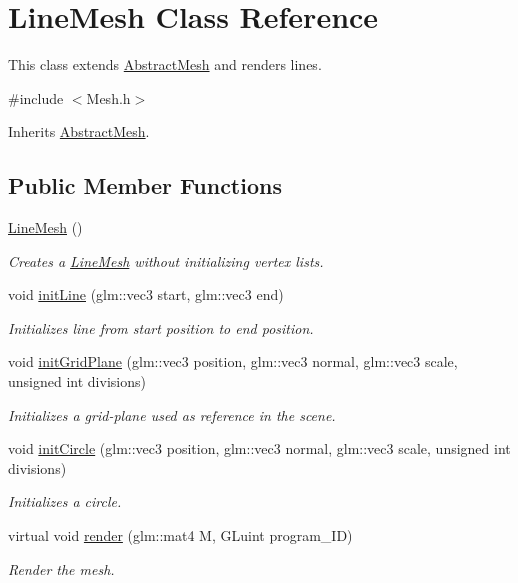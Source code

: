 \hypertarget{class_line_mesh}{\section{Line\-Mesh Class Reference}
\label{class_line_mesh}
}


This class extends \hyperlink{class_abstract_mesh}{Abstract\-Mesh} and renders lines.  




{\ttfamily \#include $<$Mesh.\-h$>$}



Inherits \hyperlink{class_abstract_mesh}{Abstract\-Mesh}.

\subsection*{Public Member Functions}
\begin{DoxyCompactItemize}
\item 
\hyperlink{class_line_mesh_a2a4c9b45b462d7733ca95020342c828a}{Line\-Mesh} ()
\begin{DoxyCompactList}\small\item\em Creates a \hyperlink{class_line_mesh}{Line\-Mesh} without initializing vertex lists. \end{DoxyCompactList}\item 
void \hyperlink{class_line_mesh_ae39037e3e68db0d05102225b3958e368}{init\-Line} (glm\-::vec3 start, glm\-::vec3 end)
\begin{DoxyCompactList}\small\item\em Initializes line from start position to end position. \end{DoxyCompactList}\item 
void \hyperlink{class_line_mesh_ad635ffbca27ac5d40cdaa24e4dd5f2d8}{init\-Grid\-Plane} (glm\-::vec3 position, glm\-::vec3 normal, glm\-::vec3 scale, unsigned int divisions)
\begin{DoxyCompactList}\small\item\em Initializes a grid-\/plane used as reference in the scene. \end{DoxyCompactList}\item 
void \hyperlink{class_line_mesh_a3367b57d600876a95ca20de56335e47f}{init\-Circle} (glm\-::vec3 position, glm\-::vec3 normal, glm\-::vec3 scale, unsigned int divisions)
\begin{DoxyCompactList}\small\item\em Initializes a circle. \end{DoxyCompactList}\item 
virtual void \hyperlink{class_line_mesh_ab2e04404f48e57ff9c8a03c3fee7b0bb}{render} (glm\-::mat4 M, G\-Luint program\-\_\-\-I\-D)
\begin{DoxyCompactList}\small\item\em Render the mesh. \end{DoxyCompactList}\end{DoxyCompactItemize}
